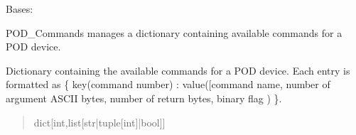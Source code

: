 \documentclass[letterpaper,10pt,english]{sphinxmanual}
\begin{document}
\begin{fulllineitems}
\label{\detokenize{Morelia.Commands:Morelia.Commands.PodCommands.CommandSet}}
\pysigstartsignatures
{}
\pysigstopsignatures
\sphinxAtStartPar
Bases: 

\sphinxAtStartPar
POD\_Commands manages a dictionary containing available commands for a POD device.

\begin{fulllineitems}
\label{\detokenize{Morelia.Commands:Morelia.Commands.PodCommands.CommandSet.__commands}}
\pysigstartsignatures
{}
\pysigstopsignatures
\sphinxAtStartPar
Dictionary containing the available commands for             a POD device. Each entry is formatted as \{ key(command number) : value({[}command name, number             of argument ASCII bytes, number of return bytes, binary flag ) \}.
\begin{quote}\begin{description}
\sphinxAtStartPar
dict{[}int,list{[}str|tuple{[}int{]}|bool{]}{]}

\end{description}\end{quote}

\end{fulllineitems}



\end{fulllineitems}
\end{document}

